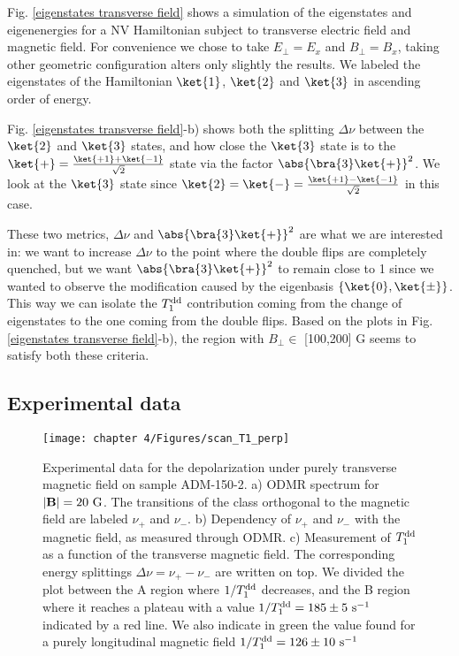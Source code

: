 \documentclass[a4paper,11pt]{report}
\begin{document}
\begin{refsection}
Fig. \ref{eigenstates transverse field} shows a simulation of the eigenstates and eigenenergies for a NV Hamiltonian subject to transverse electric field and magnetic field. For convenience we chose to take $E_\perp = E_x$ and $B_\perp = B_x$, taking other geometric configuration alters only slightly the results. We labeled the eigenstates of the Hamiltonian $\ket{1}$, $\ket{2}$ and $\ket{3}$ in ascending order of energy.

Fig. \ref{eigenstates transverse field}-b) shows both the splitting $\Delta \nu$ between the $\ket{2}$ and $\ket{3}$ states, and how close the $\ket{3}$ state is to the $\ket{+}=\frac{\ket{+1}+\ket{-1}}{\sqrt{2}}$ state via the factor $\abs{\bra{3}\ket{+}}^2$. We look at the $\ket{3}$ state since $\ket{2}=\ket{-}=\frac{\ket{+1}-\ket{-1}}{\sqrt{2}}$ in this case.

These two metrics, $\Delta \nu$ and $\abs{\bra{3}\ket{+}}^2$ are what we are interested in: we want to increase $\Delta \nu$ to the point where the double flips are completely quenched, but we want $\abs{\bra{3}\ket{+}}^2$ to remain close to 1 since we wanted to observe the modification caused by the eigenbasis $\{\ket{0},\ket{\pm}\}$. This way we can isolate the $T_1^{\rm dd}$ contribution coming from the change of eigenstates to the one coming from the double flips. Based on the plots in Fig.\ref{eigenstates transverse field}-b), the region with $B_\perp \in$ [100,200] G seems to satisfy both these criteria.

\subsection{Experimental data}

\begin{figure}[h!]
\centering
\texttt{[image: chapter 4/Figures/scan\_T1\_perp]}
\caption{Experimental data for the depolarization under purely transverse magnetic field on sample ADM-150-2. a) ODMR spectrum for $|\mathbf{B}|=20\ \rm G$. The transitions of the class orthogonal to the magnetic field are labeled $\nu_+$ and $\nu_-$. b) Dependency of $\nu_+$ and $\nu_-$ with the magnetic field, as measured through ODMR. c) Measurement of $T_1^{\rm dd}$ as a function of the transverse magnetic field. The corresponding energy splittings $\Delta \nu=\nu_+-\nu_-$ are written on top. We divided the plot between the A region where $1/T_1^{\rm dd}$ decreases, and the B region where it reaches a plateau with a value $1/T_1^{\rm dd}=185 \pm 5\ \rm s^{-1}$ indicated by a red line. We also indicate in green the value found for a purely longitudinal magnetic field $1/T_1^{\rm dd}=126 \pm 10\ \rm s^{-1}$}
\label{champ tranverse exp}
\end{figure}


\end{refsection}
\end{document}
